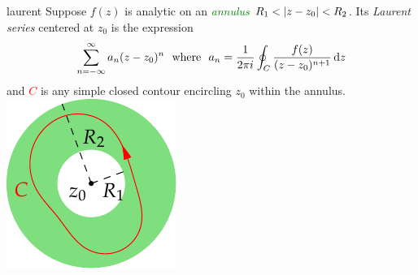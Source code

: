\begin{defn}[lower separated=false, sidebyside, sidebyside align=top seam, sidebyside gap=0pt, righthand width=0.25\linewidth]{}{laurent}
	Suppose $f(z)$ is analytic on an \textcolor{Green}{\emph{annulus}} $R_1<\left| z-z_0\right|<R_2$. Its \emph{Laurent series} centered at $z_0$ is the expression
	\[
		\sum_{n=-\infty}^\infty a_n(z-z_0)^n
		\ \text{ where }\ 
		a_n=\frac 1{2\pi i}\oint_C\frac{f(z)}{(z-z_0)^{n+1}}\,\dz
	\]
	and \textcolor{red}{$C$} is any simple closed contour encircling $z_0$ within the annulus.
	\tcblower
	\flushright\includegraphics[scale=0.95]{laurent2}
\end{defn}


